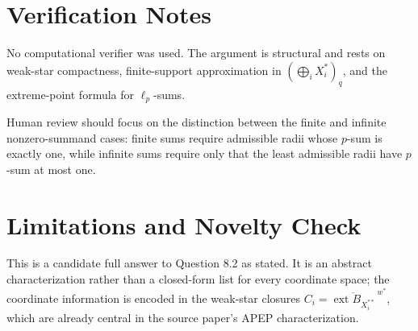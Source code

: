 \documentclass[11pt]{article}
\newcommand{\ext}{\operatorname{ext}}
\newcommand{\Ball}{B}
\newcommand{\wstar}{w^*}
\begin{document}
\section*{Verification Notes}

No computational verifier was used. The argument is structural and rests
on weak-star compactness, finite-support approximation in
$(\bigoplus_i X_i^*)_q$, and the extreme-point formula for $\ell_p$-sums.

Human review should focus on the distinction between the finite and
infinite nonzero-summand cases: finite sums require admissible radii whose
$p$-sum is exactly one, while infinite sums require only that the least
admissible radii have $p$-sum at most one.

\section*{Limitations and Novelty Check}

This is a candidate full answer to Question 8.2 as stated. It is an
abstract characterization rather than a closed-form list for every
coordinate space; the coordinate information is encoded in the weak-star
closures $C_i=\overline{\ext\Ball_{X_i^{**}}}^{\,\wstar}$, which are
already central in the source paper's APEP characterization.
\end{document}
